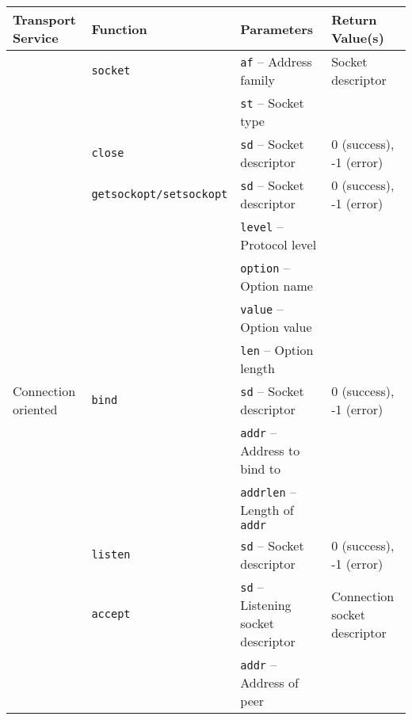 \documentclass{sig-alternate-05-2015}
\begin{document}
\begin{table*}[t]
  \centering
  \begin{tabularx}{\textwidth}{llll}
    \toprule
      Transport Service            & Function & Parameters                                     & Return Value(s) \\
    \midrule
                                   & \texttt{socket}
                                              & \texttt{af} -- Address family                  & Socket descriptor \\
                                   &          & \texttt{st} -- Socket type & \\
                                   & \texttt{close}
                                              & \texttt{sd} -- Socket descriptor               & 0 (success), -1 (error) \\
    \midrule
                                   & \texttt{getsockopt/setsockopt}                                    
                                              & \texttt{sd} -- Socket descriptor               & 0 (success), -1 (error) \\
                                   &          & \texttt{level} -- Protocol level & \\
                                   &          & \texttt{option} -- Option name & \\
                                   &          & \texttt{value} -- Option value & \\
                                   &          & \texttt{len} -- Option length & \\
    \midrule
      Connection oriented          & \texttt{bind}
                                              & \texttt{sd} -- Socket descriptor               & 0 (success), -1 (error) \\
                                   &          & \texttt{addr} -- Address to bind to & \\
                                   &          & \texttt{addrlen} -- Length of \texttt{addr} & \\
                                   & \texttt{listen}
                                              & \texttt{sd} -- Socket descriptor               & 0 (success), -1 (error) \\
                                   & \texttt{accept}
                                              & \texttt{sd} -- Listening socket descriptor     & Connection socket descriptor \\
                                   &          & \texttt{addr} -- Address of peer & \\

\end{tabularx}
\end{table*}
\end{document}
